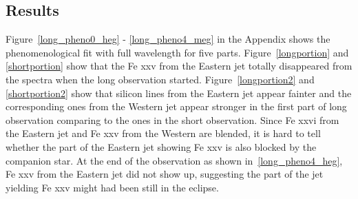 \subsection{Results}
Figure~\ref{long_pheno0_heg} - \ref{long_pheno4_meg} in the Appendix shows the phenomenological fit with full wavelength for five parts. Figure~\ref{longportion} and \ref{shortportion} show that the Fe {\sc xxv} from the Eastern jet totally disappeared from the spectra when the long observation started. Figure~\ref{longportion2} and \ref{shortportion2} show that silicon lines from the Eastern jet appear fainter and the corresponding ones from the Western jet appear stronger in the first part of long observation comparing to the ones in the short observation. Since Fe {\sc xxvi} from the Eastern jet and Fe {\sc xxv} from the Western are blended, it is hard to tell whether the part of the Eastern jet showing Fe {\sc xxv} is also blocked by the companion star. At the end of the observation as shown in~\ref{long_pheno4_heg}, Fe {\sc xxv} from the Eastern jet did not show up, suggesting the part of the jet yielding Fe {\sc xxv} might had been still in the eclipse.\par


